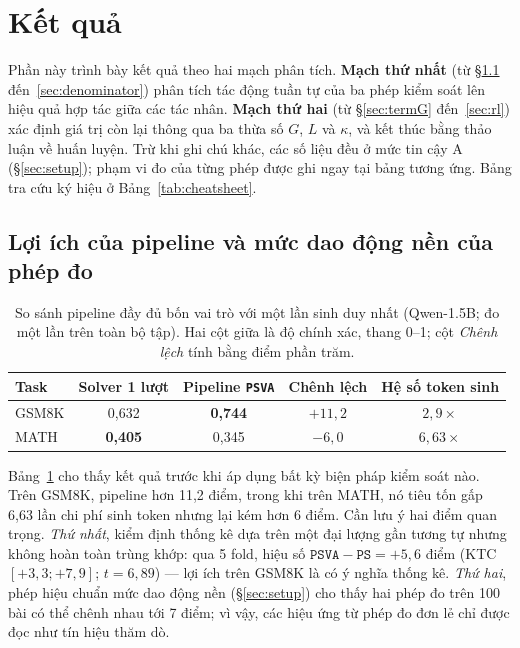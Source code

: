 \section{Kết quả}\label{sec:results}

Phần này trình bày kết quả theo hai mạch phân tích. \textbf{Mạch thứ nhất} (từ \S\ref{sec:start} đến~\ref{sec:denominator}) phân tích tác động tuần tự của ba phép kiểm soát lên hiệu quả hợp tác giữa các tác nhân. \textbf{Mạch thứ hai} (từ \S\ref{sec:termG} đến~\ref{sec:rl}) xác định giá trị còn lại thông qua ba thừa số $G$, $L$ và $\kappa$, và kết thúc bằng thảo luận về huấn luyện. Trừ khi ghi chú khác, các số liệu đều ở mức tin cậy A (\S\ref{sec:setup}); phạm vi đo của từng phép được ghi ngay tại bảng tương ứng. Bảng tra cứu ký hiệu ở Bảng~\ref{tab:cheatsheet}.

\subsection{Lợi ích của pipeline và mức dao động nền của phép đo}\label{sec:start}

\begin{table}[h]\centering\small
\begin{tabular}{@{}l c c c c@{}}
\toprule
Task & Solver 1 lượt & Pipeline \texttt{PSVA} & Chênh lệch & Hệ số token sinh\\
\midrule
GSM8K & 0,632 & \textbf{0,744} & $+11{,}2$ & $2{,}9\times$\\
MATH  & \textbf{0,405} & 0,345 & $-6{,}0$ & $6{,}63\times$\\
\bottomrule
\end{tabular}
\caption{So sánh pipeline đầy đủ bốn vai trò với một lần sinh duy nhất (Qwen-1.5B; đo một lần trên
toàn bộ tập). Hai cột giữa là độ chính xác, thang 0--1; cột \emph{Chênh lệch} tính bằng điểm phần trăm.}
\label{tab:pipeline}
\end{table}

Bảng~\ref{tab:pipeline} cho thấy kết quả trước khi áp dụng bất kỳ biện pháp kiểm soát nào. Trên GSM8K, pipeline hơn 11,2 điểm, trong khi trên MATH, nó tiêu tốn gấp 6,63 lần chi phí sinh token nhưng lại kém hơn 6 điểm. Cần lưu ý hai điểm quan trọng. \emph{Thứ nhất}, kiểm định thống kê dựa trên một đại lượng gần tương tự nhưng không hoàn toàn trùng khớp: qua 5 fold, hiệu số $\texttt{PSVA}-\texttt{PS} = +5{,}6$ điểm (KTC $[+3{,}3;+7{,}9]$; $t=6{,}89$) --- lợi ích trên GSM8K là có ý nghĩa thống kê. \emph{Thứ hai}, phép hiệu chuẩn mức dao động nền (\S\ref{sec:setup}) cho thấy hai phép đo trên 100 bài có thể chênh nhau tới 7 điểm; vì vậy, các hiệu ứng từ phép đo đơn lẻ chỉ được đọc như tín hiệu thăm dò.

